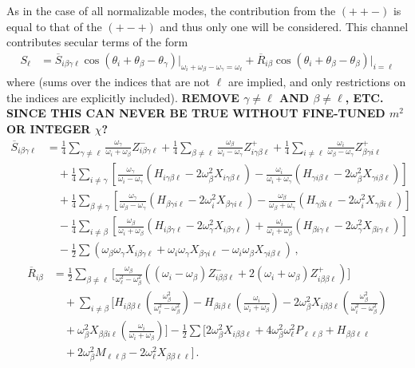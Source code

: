 \documentclass[letterpaper,11pt]{article}
\newcommand{\oi}{\omega_i}
\newcommand{\ol}{\omega_\ell}
\newcommand{\obet}{\omega_{\beta}}
\newcommand{\ogam}{\omega_\gamma}
\begin{document}
As in the case of all normalizable modes, the contribution from the $(++-)$ is equal to that of the $(+-+)$ and thus only one will be considered. This channel contributes secular terms of the form
\begin{align}
S_\ell &= \overline{S}_{i \beta \gamma \ell} \cos \left( \theta_i + \theta_\beta - \theta_\gamma \right) \Big|_{\oi + \obet - \ogam = \ol} + \overline{R}_{i \beta} \cos \left(\theta_i + \theta_\beta - \theta_\beta \right) \Big|_{i = \ell}
\end{align}
where (sums over the indices that are not $\ell$ are implied, and only restrictions on the indices are explicitly included). {\bf REMOVE $\gamma \neq \ell$ AND $\beta \neq \ell$, ETC. SINCE THIS CAN NEVER BE TRUE WITHOUT FINE-TUNED $m^2$ OR INTEGER $\chi$?}
\begin{align}
\overline{S}_{i \beta \gamma \ell} &= \frac{1}{4} \sum_{\gamma \neq \ell} \frac{\ogam}{\oi + \obet} Z^{-}_{i \beta \gamma \ell} + \frac{1}{4} \sum_{\beta \neq \ell} \frac{\obet}{\oi - \ogam} Z^+_{i \gamma \beta \ell} + \frac{1}{4} \sum_{i \neq \ell} \frac{\oi}{\obet - \ogam} Z^+_{\beta \gamma i \ell} \nonumber \\
%
& \quad + \frac{1}{4} \sum_{i \neq \gamma} \left[ \frac{\omega_\gamma}{\oi - \ogam} (H_{i \gamma \beta \ell} - 2\obet^2 X_{i \gamma \beta \ell}) - \frac{\oi}{\oi + \ogam} (H_{\gamma i \beta \ell} - 2\obet^2 X_{\gamma i \beta \ell} ) \right] \nonumber \\
%
& \quad + \frac{1}{4} \sum_{\beta \neq \gamma} \left[ \frac{\ogam}{\obet - \ogam} (H_{\beta \gamma i \ell} - 2 \oi^2 X_{\beta\gamma i \ell} ) - \frac{\obet}{\obet + \ogam} (H_{\gamma \beta i \ell} - 2\oi^2 X_{\gamma \beta i \ell} ) \right] \nonumber \\
%
& \quad -  \frac{1}{4} \sum_{i \neq \beta} \left[ \frac{\obet}{\oi + \obet} (H_{i \beta \gamma \ell} - 2\ogam^2 X_{i \beta \gamma \ell} ) + \frac{\oi}{\oi + \obet} (H_{\beta i \gamma \ell} - 2\ogam^2 X_{\beta i \gamma \ell}) \right] \nonumber \\
%
& \quad - \frac{1}{2} \sum \left( \obet \ogam X_{i \beta \gamma \ell} + \oi \ogam X_{\beta \gamma i \ell} - \oi \obet X_{\gamma i \beta \ell} \right) \, ,
\end{align}
\begin{align}
\overline{R}_{i \beta} &= \frac{1}{2} \sum_{\beta \neq \ell} \Big[ \frac{\obet}{\ol^2 - \obet^2} \left( (\oi - \obet) Z^{-}_{i \beta \beta \ell} + 2 (\oi + \obet) Z^+_{i\beta \beta \ell} \right) \Big]  \nonumber \\
%
& \quad + \sum_{i \neq \beta} \Big[  H_{i \beta \beta \ell} \left( \frac{\obet^2}{\oi^2 - \obet^2} \right) - H_{\beta i \beta \ell} \left( \frac{\oi}{\oi + \obet} \right) - 2\obet^2 X_{i \beta \beta \ell} \left( \frac{\obet^2}{\oi^2 - \obet^2} \right) \nonumber \\
%
& \quad + \obet^2 X_{\beta \beta i \ell} \left( \frac{\oi}{\oi + \obet} \right) \Big] - \frac{1}{2} \sum \Big[ 2 \obet^2 X_{i\beta\beta \ell} + 4 \obet^2 \ol^2 P_{\ell \ell \beta} + H_{\beta \beta \ell \ell}  \nonumber \\
%
& \quad + 2\obet^2 M_{\ell \ell \beta} - 2\ol^2 X_{\beta \beta \ell \ell} \Big] \, .
\end{align}
\end{document}
